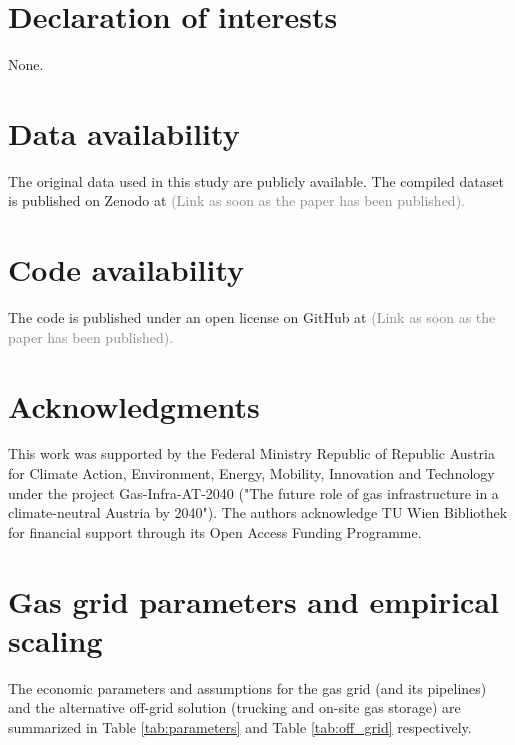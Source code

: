\documentclass[review]{elsarticle}
\begin{document}
\section*{Declaration of interests}
None.
\section*{Data availability}
The original data used in this study are publicly available. The compiled dataset is published on Zenodo at \textcolor{gray}{(Link as soon as the paper has been published).} 
\section*{Code availability}
The code is published under an open license on GitHub at \textcolor{gray}{(Link as soon as the paper has been published).}

\section*{Acknowledgments}
This work was supported by the Federal Ministry Republic of Republic Austria
for Climate Action, Environment, Energy, Mobility, Innovation and Technology under the project Gas-Infra-AT-2040 ("The future role of gas infrastructure in a climate-neutral Austria by 2040").  The authors acknowledge TU Wien Bibliothek for financial support through its Open Access Funding Programme.



\appendix
\setcounter{table}{0}
\setcounter{figure}{0}
\newpage
\section{Gas grid parameters and empirical scaling}\label{paramter}
The economic parameters and assumptions for the gas grid (and its pipelines) and the alternative off-grid solution (trucking and on-site gas storage) are summarized in Table \ref{tab:parameters} and Table \ref{tab:off_grid} respectively. 
\end{document}
